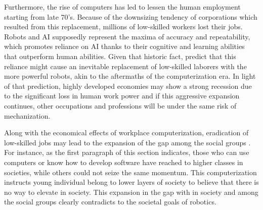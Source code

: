 \documentclass[man]{apa6}
\begin{document}
Furthermore, the rise of computers has led to lessen the human employment starting from late 70's.
Because of the downsizing tendency of corporations which resulted from this replacement, millions of low-skilled workers lost their jobs.
Robots and AI supposedly represent the maxima of accuracy and repeatability, which promotes reliance on AI thanks to their cognitive and learning abilities that outperform human abilities.
Given that historic fact,  predict that this reliance might cause an inevitable replacement of low-skilled laborers with the more powerful robots, akin to the aftermaths of the computerization era.
In light of that prediction, highly developed economies may show a strong recession due to the significant loss in human work power and if this aggressive expansion continues, other occupations and professions will be under the same risk of mechanization. \par

Along with the economical effects of workplace computerization, eradication of low-skilled jobs may lead to the expansion of the gap among the social groups \cite{gre}.
For instance, as the first paragraph of this section indicates, those who can use computers or know how to develop software have reached to higher classes in societies, while others could not seize the same momentum.
This computerization instructs young individual belong to lower layers of society to believe that there is no way to elevate in society.
This expansion in the gap with in society and among the social groups clearly contradicts to the societal goals of robotics.
\end{document}
